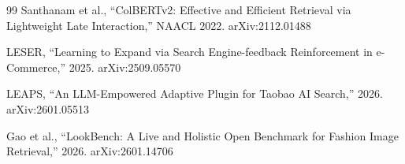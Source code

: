 \documentclass[11pt,a4paper]{article}
\begin{document}
\begin{thebibliography}{99}
 Santhanam et al., ``ColBERTv2: Effective and Efficient Retrieval via Lightweight Late Interaction,'' NAACL 2022. arXiv:2112.01488

 LESER, ``Learning to Expand via Search Engine-feedback Reinforcement in e-Commerce,'' 2025. arXiv:2509.05570

 LEAPS, ``An LLM-Empowered Adaptive Plugin for Taobao AI Search,'' 2026. arXiv:2601.05513

 Gao et al., ``LookBench: A Live and Holistic Open Benchmark for Fashion Image Retrieval,'' 2026. arXiv:2601.14706

\end{thebibliography}
\end{document}
